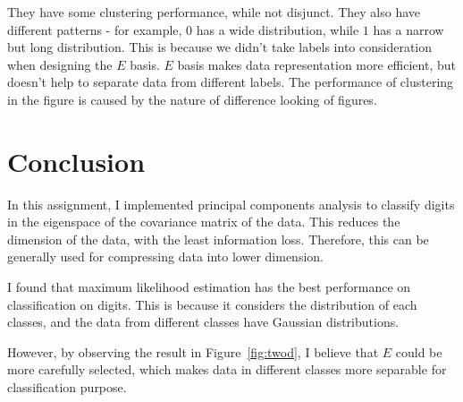 \documentclass[10pt]{article}
\begin{document}
They have some clustering performance, while not disjunct. They also
have different patterns - for example, $0$ has a wide distribution,
while $1$ has a narrow but long distribution. This is because we
didn't take labels into consideration when designing the $E$ basis.
$E$ basis makes data representation more efficient, but doesn't help
to separate data from different labels. The performance of clustering
in the figure is caused by the nature of difference looking of
figures.

\section{Conclusion}

In this assignment, I implemented principal components analysis to
classify digits in the eigenspace of the covariance matrix of the
data. This reduces the dimension of the data, with the least
information loss. Therefore, this can be generally used for
compressing data into lower dimension.

I found that maximum likelihood estimation has the best performance on
classification on digits. This is because it considers the
distribution of each classes, and the data from different classes have
Gaussian distributions.

However, by observing the result in Figure~\ref{fig:twod}, I believe
that $E$ could be more carefully selected, which makes data in
different classes more separable for classification purpose.
\end{document}
